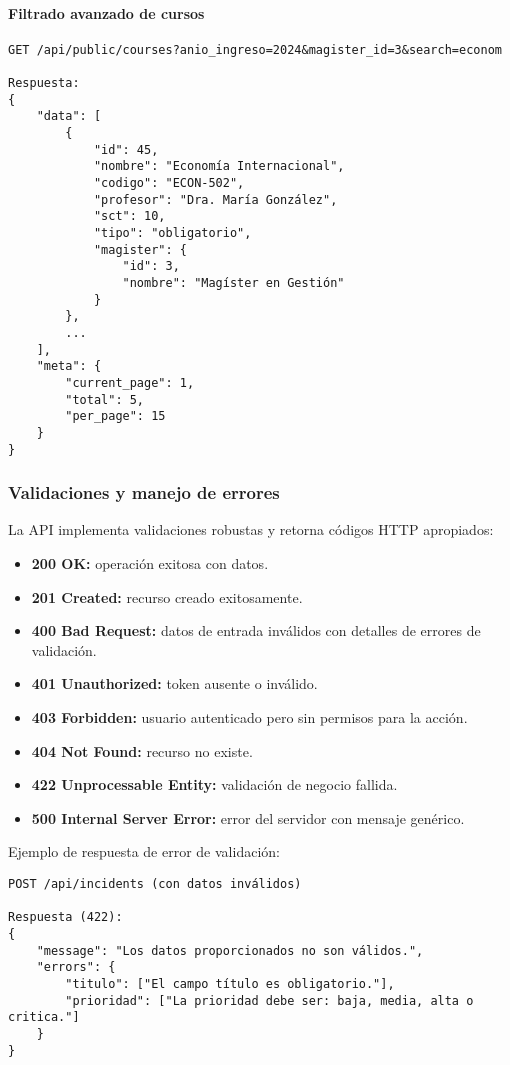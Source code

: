 \paragraph{Filtrado avanzado de cursos}

\begin{verbatim}
GET /api/public/courses?anio_ingreso=2024&magister_id=3&search=econom

Respuesta:
{
    "data": [
        {
            "id": 45,
            "nombre": "Economía Internacional",
            "codigo": "ECON-502",
            "profesor": "Dra. María González",
            "sct": 10,
            "tipo": "obligatorio",
            "magister": {
                "id": 3,
                "nombre": "Magíster en Gestión"
            }
        },
        ...
    ],
    "meta": {
        "current_page": 1,
        "total": 5,
        "per_page": 15
    }
}
\end{verbatim}

\subsubsection{Validaciones y manejo de errores}

La API implementa validaciones robustas y retorna códigos HTTP apropiados:

\begin{itemize}
    \item \textbf{200 OK:} operación exitosa con datos.
    \item \textbf{201 Created:} recurso creado exitosamente.
    \item \textbf{400 Bad Request:} datos de entrada inválidos con detalles de errores de validación.
    \item \textbf{401 Unauthorized:} token ausente o inválido.
    \item \textbf{403 Forbidden:} usuario autenticado pero sin permisos para la acción.
    \item \textbf{404 Not Found:} recurso no existe.
    \item \textbf{422 Unprocessable Entity:} validación de negocio fallida.
    \item \textbf{500 Internal Server Error:} error del servidor con mensaje genérico.
\end{itemize}

Ejemplo de respuesta de error de validación:

\begin{verbatim}
POST /api/incidents (con datos inválidos)

Respuesta (422):
{
    "message": "Los datos proporcionados no son válidos.",
    "errors": {
        "titulo": ["El campo título es obligatorio."],
        "prioridad": ["La prioridad debe ser: baja, media, alta o critica."]
    }
}
\end{verbatim}

